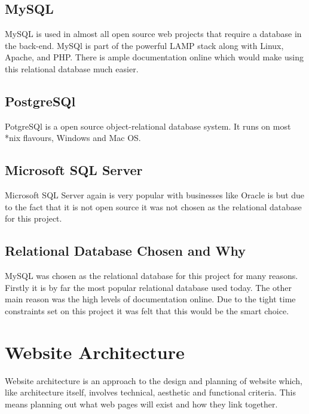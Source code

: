\documentclass[a4paper, 12pt]{report}
\begin{document}
\subsection{MySQL}
MySQL is used in almost all open source web projects that require a database in the back-end. MySQl is part of the powerful LAMP stack along with Linux, Apache, and PHP. There is ample documentation online which would make using this relational database much easier\cite{MySQL}. 

\subsection{PostgreSQl} 
PotgreSQl is a open source object-relational database system. It runs on most *nix flavours, Windows and Mac OS\cite{PostgreSQL}. 

\subsection{Microsoft SQL Server}
Microsoft SQL Server again is very popular with businesses like Oracle is but due to the fact that it is not open source it was not chosen as the relational database for this project\cite{microsoftSQl}.

\subsection{Relational Database Chosen and Why}
MySQL was chosen as the relational database for this project for many reasons. Firstly it is by far the most popular relational database used today. The other main reason was the high levels of documentation online. Due to the tight time constraints set on this project it was felt that this would be the smart choice.

\section{Website Architecture}
Website architecture is an approach to the design and planning of website which, like architecture itself, involves technical, aesthetic and functional criteria\cite{web_arch}. This means planning out what web pages will exist and how they link together. \\
\end{document}
